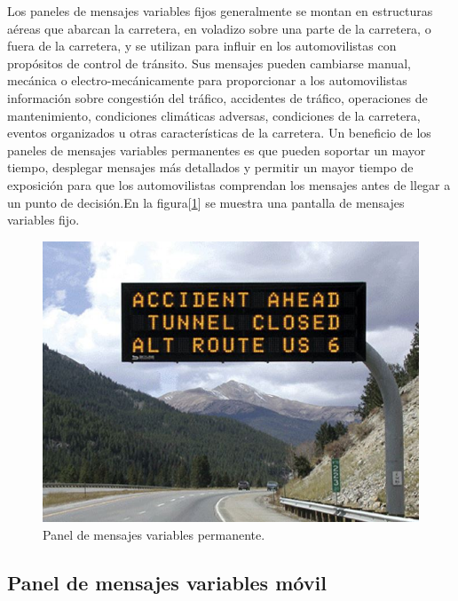 Los paneles de mensajes variables fijos generalmente se montan en estructuras aéreas que abarcan la carretera, en voladizo sobre una parte de la carretera, o fuera de la carretera, y se utilizan para influir en los automovilistas con propósitos de control de tránsito. Sus mensajes pueden cambiarse manual, mecánica o electro-mecánicamente para proporcionar a los automovilistas información sobre congestión del tráfico, accidentes de tráfico, operaciones de mantenimiento, condiciones climáticas adversas, condiciones de la carretera, eventos organizados u otras características de la carretera. Un beneficio de los paneles de mensajes variables permanentes es que pueden soportar un mayor tiempo, desplegar mensajes más detallados y permitir un mayor tiempo de exposición para que los automovilistas comprendan los mensajes antes de llegar a un punto de decisión.En la figura[\ref{fig:vmsp}] se muestra una pantalla de mensajes variables fijo\citep{VMSTYPES}.


\begin{figure}[htpb]
	\centering
	\includegraphics[width=.9\textwidth]{../Figures/vmspermanente.jpg} 
	\caption{Panel de mensajes variables permanente\protect\footnotemark.}
	\label{fig:vmsp}
\end{figure}




\subsection{Panel de mensajes variables móvil}

